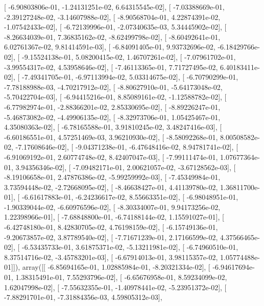\documentclass{article}
\begin{document}
       [ -6.90803806e-01,  -1.24131251e-02,   6.64315545e-02],
       [ -7.03388669e-01,  -2.39127248e-02,  -3.14607988e-02],
       [ -8.90568704e-01,   4.22874391e-02,  -1.07542433e-02],
       [ -6.72139996e-01,  -2.07340635e-03,   5.34445902e-02],
       [ -8.26634039e-01,   7.36835162e-02,  -8.62499798e-02],
       [ -8.60492641e-01,   6.02761367e-02,   9.81414591e-03],
       [ -6.84091405e-01,   9.93732696e-02,  -6.18429766e-02],
       [ -9.15524138e-01,   5.08200415e-02,   1.46707261e-02],
       [ -7.07961702e-01,  -3.99554317e-02,   4.53958646e-02],
       [ -7.46113365e-01,   7.71727495e-02,   6.40183411e-02],
       [ -7.49341705e-01,  -6.97113994e-02,   5.03314675e-02],
       [ -6.70790299e-01,  -7.78188988e-03,  -4.70217912e-02],
       [ -8.80627910e-01,  -5.64173048e-02,  -5.70422704e-03],
       [ -6.94415216e-01,   8.85089161e-02,  -1.12588782e-02],
       [ -6.77982974e-01,  -2.88366201e-02,   2.85330695e-02],
       [ -8.89226247e-01,  -5.46873082e-02,  -4.49906135e-02],
       [ -8.32973706e-01,   1.05425467e-01,   4.35080363e-02],
       [ -6.78165588e-01,   3.91810245e-02,   3.48247416e-03],
       [ -6.60186551e-01,   4.57251469e-03,   3.96210930e-02],
       [ -8.58092268e-01,   8.00508582e-02,  -7.17608646e-02],
       [ -9.04371238e-01,  -6.47648416e-02,   8.94781741e-02],
       [ -6.91069192e-01,   2.60774748e-02,   8.42407047e-03],
       [ -7.99111474e-01,   1.07677364e-01,   3.94356346e-02],
       [ -7.09482171e-01,   2.00621057e-02,  -3.67128562e-03],
       [ -8.19106658e-01,   2.47876386e-02,  -5.99259992e-03],
       [ -7.45349984e-01,   3.73594448e-02,  -2.72668095e-02],
       [ -8.46638427e-01,   4.41139780e-02,   1.36811700e-01],
       [ -6.61617883e-01,  -6.24236617e-02,   8.55663351e-02],
       [ -6.98048951e-01,  -1.90339044e-02,  -6.60976596e-02],
       [ -8.30334007e-01,   9.94173256e-02,   1.22398966e-01],
       [ -7.68848800e-01,  -6.74188144e-02,   1.15591027e-01],
       [ -6.42748180e-01,   8.42830705e-02,   4.76198159e-02],
       [ -6.15749136e-01,  -9.20673857e-02,   3.87789540e-02],
       [ -7.71671239e-01,   2.17166599e-02,   4.37566465e-02],
       [ -6.53435733e-01,   3.61875371e-02,  -5.13211981e-02],
       [ -6.74960510e-01,   8.37514716e-02,  -3.45783201e-03],
       [ -6.67914013e-01,   3.98115357e-02,   1.05774488e-01]]), array([[ -6.85694165e-01,   1.02885984e-01,  -8.20321334e-02],
       [ -6.94617694e-01,   1.38315491e-01,   7.55293796e-02],
       [ -6.65676958e-01,   8.59234099e-02,   1.62047998e-02],
       [ -7.55632355e-01,  -1.40978441e-02,  -5.23951372e-02],
       [ -7.88291701e-01,  -7.31884356e-03,   4.59805312e-03],
\end{document}
